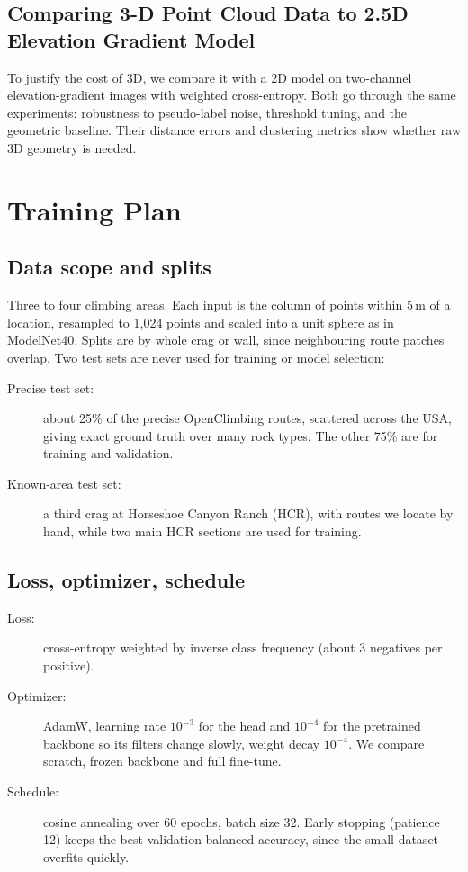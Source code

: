 \documentclass{mva2011}
\begin{document}
\subsection{Comparing 3-D Point Cloud Data to 2.5D Elevation Gradient Model}
To justify the cost of 3D, we compare it with a 2D model on two-channel elevation-gradient images with weighted cross-entropy. Both go through the same experiments: robustness to pseudo-label noise, threshold tuning, and the geometric baseline. Their distance errors and clustering metrics show whether raw 3D geometry is needed.

\section{Training Plan}
\subsection{Data scope and splits}
    Three to four climbing areas. Each input is the column of points within 5\,m of a location, resampled to 1,024 points and scaled into a unit sphere as in ModelNet40. Splits are by whole crag or wall, since neighbouring route patches overlap. Two test sets are never used for training or model selection:
    \begin{description}
    \item[Precise test set:] about 25\% of the precise OpenClimbing routes, scattered across the USA, giving exact ground truth over many rock types. The other 75\% are for training and validation.
    \item[Known-area test set:] a third crag at Horseshoe Canyon Ranch (HCR), with routes we locate by hand, while two main HCR sections are used for training.
    \end{description}

\subsection{Loss, optimizer, schedule}
    \begin{description}
    \item[Loss:] cross-entropy weighted by inverse class frequency (about 3 negatives per positive).
    \item[Optimizer:] AdamW, learning rate $10^{-3}$ for the head and $10^{-4}$ for the pretrained backbone so its filters change slowly, weight decay $10^{-4}$. We compare scratch, frozen backbone and full fine-tune.
    \item[Schedule:] cosine annealing over 60 epochs, batch size 32. Early stopping (patience 12) keeps the best validation balanced accuracy, since the small dataset overfits quickly.
    \end{description}
\end{document}
